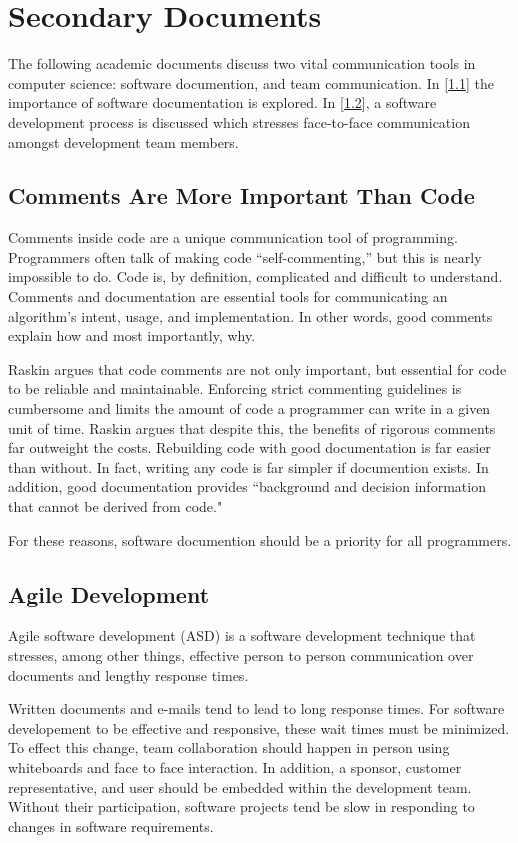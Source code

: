 \documentclass[prodmode,acmtecs]{acmsmall} %
\begin{document}
{\section{Secondary Documents}\label{sec_documents}
The following academic documents discuss two vital communication tools in computer science: software documention, and team communication.  In [\ref{comments}] the importance of software documentation is explored.  In [\ref{agile}], a software development process is discussed which stresses face-to-face communication amongst development team members.

\subsection{Comments Are More Important Than Code}\label{comments}
Comments inside code are a unique communication tool of programming.  Programmers often talk of making code ``self-commenting,'' but this is nearly impossible to do.  Code is, by definition, complicated and difficult to understand.  Comments and documentation are essential tools for communicating an algorithm's intent, usage, and implementation.  In other words, good comments explain how and most importantly, why.\cite{raskin}

Raskin argues that code comments are not only important, but essential for code to be reliable and maintainable.  Enforcing strict commenting guidelines is cumbersome and limits the amount of code a programmer can write in a given unit of time.  Raskin argues that despite this, the benefits of rigorous comments far outweight the costs.  Rebuilding code with good documentation is far easier than without.  In fact, writing any code is far simpler if documention exists.  In addition, good documentation provides ``background and decision information that cannot be derived from code."   \cite{raskin}

For these reasons, software documention should be a priority for all programmers.  

\subsection{Agile Development}\label{agile}
Agile software development (ASD) is a software development technique that stresses, among other things, effective person to person communication over documents and lengthy response times.\cite{highsmith}   

Written documents and e-mails tend to lead to long response times. For software developement to be effective and responsive, these wait times must be minimized.  To effect this change, team collaboration should happen in person using whiteboards and face to face interaction.   In addition, a sponsor, customer representative, and user should be embedded within the development team.  Without their participation, software projects tend be slow in responding to changes in software requirements.\cite{highsmith}

}
\end{document}
